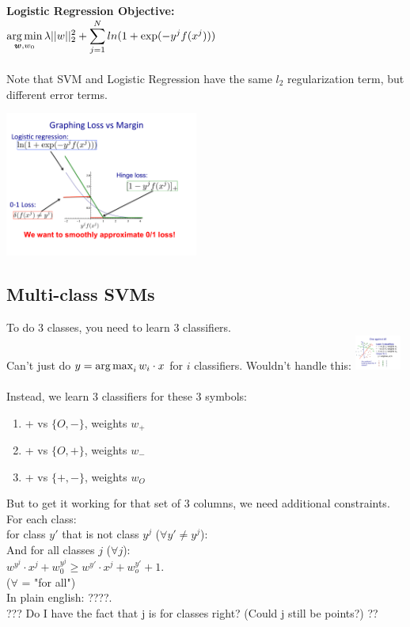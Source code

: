 \textbf{Logistic Regression Objective:} \hfill \\
$\displaystyle  \operatorname*{arg\,min}_{\bm{w}, w_0} \lambda ||w||_2^2 + \sum_{j=1}^N ln(1 + \exp(-y^j f(x^j)))$ \hfill \\
 \hfill \\
 
 Note that SVM and Logistic Regression have the same $l_2$ regularization term, but different error terms. 

 \includegraphics[width=2.5in]{figures/LR_svm_step_losses.pdf}
 
 \subsection{Multi-class SVMs}
 To do 3 classes, you need to learn 3 classifiers. \hfill \\
 Can't just do $y = \operatorname*{arg\,max}_i w_i \cdot x$ for $i$ classifiers.  
 Wouldn't handle this: 
 \includegraphics[width=0.6in]{figures/multiclass_svm_motivation.pdf}
 \hfill \\  \hfill \\
 
 Instead, we learn 3 classifiers for these 3 symbols: 
 \begin{enumerate}
 	\item + vs $\{ O, - \}$, weights $w_+$
	\item + vs $\{ O, + \}$, weights $w_-$
	\item + vs $\{ +, - \}$, weights $w_O$
 \end{enumerate}
 But to get it working for that set of 3 columns, we need additional constraints.  \hfill \\
 For each class: \hfill \\
 for class $y'$ that is not class $y^j$ ($\forall y' \neq y^j$):  \hfill \\
 And for all classes $j$ ($\forall j$):  \hfill \\
 $w^{y^j} \cdot x^j + w_0^{y^j} \geq w^{y'} \cdot x^j + w_o^{y'} + 1$. \hfill \\
 ($\forall$ = "for all") \hfill \\
 In plain english: ????.   \hfill \\
 ??? Do I have the fact that j is for classes right?  (Could j still be points?)  ??
 \hfill \\
 \hfill \\
 
